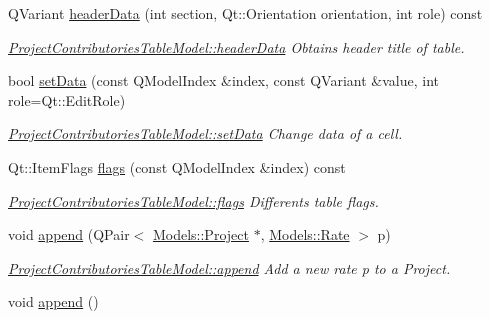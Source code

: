\begin{DoxyCompactItemize}
Q\+Variant \hyperlink{classGui_1_1Widgets_1_1WdgModels_1_1ProjectContributoriesTableModel_af1d71ae6a06b69264301744beca91ad9}{header\+Data} (int section, Qt\+::\+Orientation orientation, int role) const 
\begin{DoxyCompactList}\small\item\em \hyperlink{classGui_1_1Widgets_1_1WdgModels_1_1ProjectContributoriesTableModel_af1d71ae6a06b69264301744beca91ad9}{Project\+Contributories\+Table\+Model\+::header\+Data} Obtains header title of table. \end{DoxyCompactList}\item 
bool \hyperlink{classGui_1_1Widgets_1_1WdgModels_1_1ProjectContributoriesTableModel_ac71dc1a97c5e62b4b51002ed737dad10}{set\+Data} (const Q\+Model\+Index \&index, const Q\+Variant \&value, int role=Qt\+::\+Edit\+Role)
\begin{DoxyCompactList}\small\item\em \hyperlink{classGui_1_1Widgets_1_1WdgModels_1_1ProjectContributoriesTableModel_ac71dc1a97c5e62b4b51002ed737dad10}{Project\+Contributories\+Table\+Model\+::set\+Data} Change data of a cell. \end{DoxyCompactList}\item 
Qt\+::\+Item\+Flags \hyperlink{classGui_1_1Widgets_1_1WdgModels_1_1ProjectContributoriesTableModel_a75dd68e78aec7823ef07a01e861ff627}{flags} (const Q\+Model\+Index \&index) const 
\begin{DoxyCompactList}\small\item\em \hyperlink{classGui_1_1Widgets_1_1WdgModels_1_1ProjectContributoriesTableModel_a75dd68e78aec7823ef07a01e861ff627}{Project\+Contributories\+Table\+Model\+::flags} Differents table flags. \end{DoxyCompactList}\item 
void \hyperlink{classGui_1_1Widgets_1_1WdgModels_1_1ProjectContributoriesTableModel_a7bb1cd1299d72ce4d6a35cc38bff5a70}{append} (Q\+Pair$<$ \hyperlink{classModels_1_1Project}{Models\+::\+Project} $\ast$, \hyperlink{classModels_1_1Rate}{Models\+::\+Rate} $>$ p)
\begin{DoxyCompactList}\small\item\em \hyperlink{classGui_1_1Widgets_1_1WdgModels_1_1ProjectContributoriesTableModel_a7bb1cd1299d72ce4d6a35cc38bff5a70}{Project\+Contributories\+Table\+Model\+::append} Add a new rate {\itshape p} to a Project. \end{DoxyCompactList}\item 
\hypertarget{classGui_1_1Widgets_1_1WdgModels_1_1ProjectContributoriesTableModel_a1ff13a691bf3609677318d6ad16f81a2}{}void \hyperlink{classGui_1_1Widgets_1_1WdgModels_1_1ProjectContributoriesTableModel_a1ff13a691bf3609677318d6ad16f81a2}{append} ()\label{classGui_1_1Widgets_1_1WdgModels_1_1ProjectContributoriesTableModel_a1ff13a691bf3609677318d6ad16f81a2}


\end{DoxyCompactItemize}
